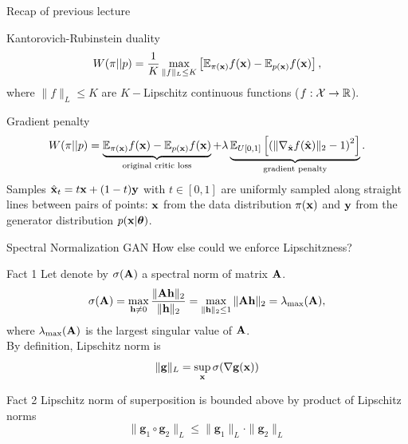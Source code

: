 \begin{frame}{Recap of previous lecture}
	\begin{block}{Kantorovich-Rubinstein duality}
		\vspace{-0.2cm}
		\[
			W(\pi || p) = \frac{1}{K} \max_{\| f \|_L \leq K} \left[ \mathbb{E}_{\pi(\mathbf{x})} f(\mathbf{x})  - \mathbb{E}_{p(\mathbf{x})} f(\mathbf{x})\right],
		\]
		where $\| f \|_L \leq K$ are $K-$Lipschitz continuous functions ($f: \mathcal{X} \rightarrow \mathbb{R}$).
	\end{block}
	\begin{block}{Gradient penalty}
		\vspace{-0.3cm}
		\[
			W(\pi || p) = \underbrace{\mathbb{E}_{\pi(\mathbf{x})} f(\mathbf{x})  - \mathbb{E}_{p(\mathbf{x})} f(\mathbf{x})}_{\text{original critic loss}} + \lambda \underbrace{\mathbb{E}_{U[0, 1]} \left[ \left( \| \nabla_{\hat{\mathbf{x}}} f(\hat{\mathbf{x}}) \|_2 - 1 \right) ^ 2\right]}_{\text{gradient penalty}}.
		\]
		Samples $\hat{\mathbf{x}}_t = t \mathbf{x} + (1 - t) \mathbf{y}$ with $t \in [0, 1]$ are uniformly sampled along straight lines between pairs of points: $\mathbf{x}$ from the data distribution $\pi(\mathbf{x})$ and $\mathbf{y}$ from the generator distribution $p(\mathbf{x} | \boldsymbol{\theta})$.
	\end{block}
\end{frame}
\begin{frame}{Spectral Normalization GAN}
	How else could we enforce Lipschitzness?
	\begin{block}{Fact 1}
		Let denote by $\sigma(\mathbf{A})$ a spectral norm of matrix $\mathbf{A}$.
		\[
			\sigma(\mathbf{A}) = \max_{\mathbf{h} \neq 0} \frac{\|\mathbf{A} \mathbf{h}\|_2}{\|\mathbf{h}\|_2} = \max_{\|\mathbf{h}\|_2 \leq 1} \| \mathbf{A} \mathbf{h} \|_2 = \lambda_{\text{max}}(\mathbf{A}),
		\]
		where $\lambda_{\text{max}}(\mathbf{A})$ is the largest singular value of $\mathbf{A}$. \\
		By definition, Lipschitz norm is 
		\[
			\| \mathbf{g} \|_L = \sup_{\mathbf{x}} \sigma( \nabla \mathbf{g}(\mathbf{x}))
		\]
	\end{block}
	\vspace{-0.5cm}
	\begin{block}{Fact 2}
		Lipschitz norm of superposition is bounded above by product of Lipschitz norms
		\vspace{-0.2cm}
		\[
			\| \mathbf{g}_1 \circ \mathbf{g}_2 \|_L \leq \| \mathbf{g}_1 \|_L \cdot \| \mathbf{g}_2\|_L
		\]
	\end{block}
\end{frame}
